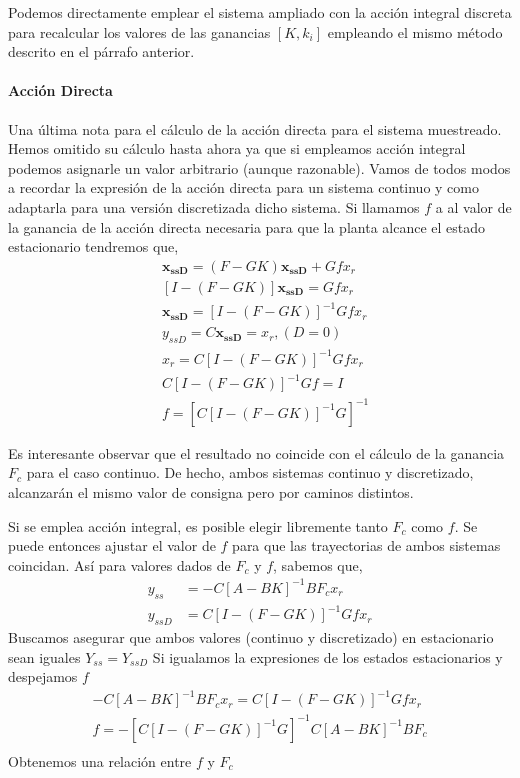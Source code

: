\documentclass[10pt,a4paper]{report}
\begin{document}
Podemos directamente emplear el sistema ampliado con la acción integral discreta para recalcular los valores de las ganancias $[K,k_i]$ empleando el mismo método descrito en el párrafo anterior.

\paragraph{Acción Directa} Una última nota para el cálculo de la acción directa para el sistema muestreado. Hemos omitido su cálculo hasta ahora ya que si empleamos acción integral podemos asignarle un valor arbitrario (aunque razonable). Vamos de todos modos a recordar la expresión de la acción directa para un sistema continuo y como adaptarla para una versión discretizada dicho sistema. Si llamamos $f$ a al valor de la ganancia de la acción directa necesaria para que la planta alcance el estado estacionario tendremos que,
\begin{align}
&\mathbf{x_{ssD}} = (F -GK)\mathbf{x_{ssD}} + Gfx_r\\
&\left[I-(F-GK) \right]\mathbf{x_{ssD}} =Gfx_r\\
&\mathbf{x_{ssD}} = \left[I-(F-GK) \right]^{-1}Gfx_r\\
&y_{ssD} = C\mathbf{x_{ssD}} = x_r, (D = 0)\\
&x_r = C\left[I-(F-GK) \right]^{-1}Gfx_r\\
&C\left[I-(F-GK) \right]^{-1}Gf = I\\
&f = \left[C\left[I-(F-GK) \right]^{-1}G\right]^{-1}
\end{align}

Es interesante observar que el resultado no coincide con el cálculo de la ganancia $F_c$ para el caso continuo. De hecho, ambos sistemas continuo y discretizado, alcanzarán el mismo valor de consigna pero por caminos distintos. 

Si se emplea acción integral, es posible elegir libremente tanto $F_c$ como $f$. Se puede entonces ajustar el valor de $f$ para que las trayectorias de ambos sistemas coincidan. Así para valores dados de $F_c$ y $f$, sabemos que,
\begin{align}
y_{ss}  &= -C\left[A-BK\right]^{-1}BF_cx_r\\
y_{ssD} &= C\left[I-(F-GK) \right]^{-1}Gfx_r
\end{align}
Buscamos asegurar que ambos valores (continuo y discretizado) en estacionario sean iguales $Y_{ss} = Y_{ssD}$ Si igualamos la expresiones de los estados estacionarios y despejamos $f$
\begin{align}
-C\left[A-BK\right]^{-1}BF_cx_r = C\left[I-(F-GK) \right]^{-1}Gfx_r\\
f = -\left[C\left[I-(F-GK) \right]^{-1}G\right]^{-1}C\left[A-BK\right]^{-1}BF_c  \\\label{eq429}
\end{align}
Obtenemos una relación entre $f$ y $F_c$
\end{document}
